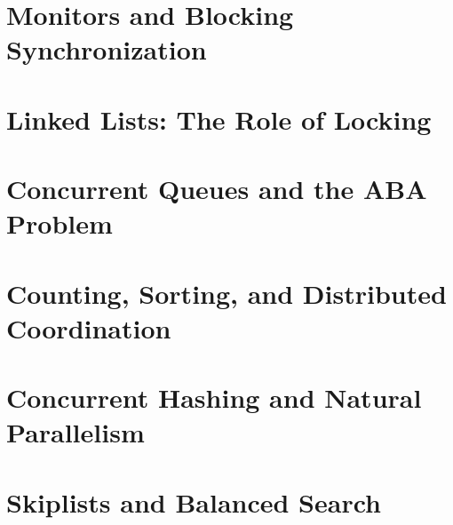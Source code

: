 \documentclass[letter,12pt]{report}
\begin{document}
\chapter{Monitors and Blocking Synchronization}



\chapter{Linked Lists: The Role of Locking}




\chapter{Concurrent Queues and the ABA Problem}





\chapter{Counting, Sorting, and Distributed Coordination}



\chapter{Concurrent Hashing and Natural Parallelism}




\chapter{Skiplists and Balanced Search}



\end{document}
